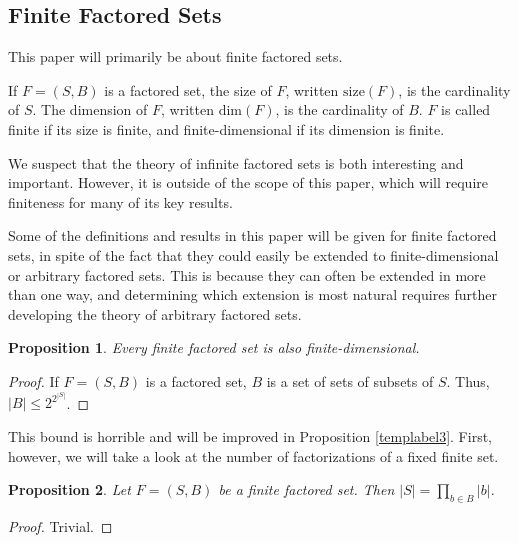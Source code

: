 \documentclass[authordate,onecolumn]{miri-tech-article}
\newtheorem{proposition}{Proposition}
\begin{document}
\subsection{Finite Factored Sets}
This paper will primarily be about finite factored sets.
\begin{definition}
If $F=(S,B)$ is a factored set, the size of $F$, written $\text{size}(F)$, is the cardinality of $S$. The dimension of $F$, written $\text{dim}(F)$, is the cardinality of $B$. $F$ is called finite if its size is finite, and finite-dimensional if its dimension is finite.
\end{definition}
We suspect that the theory of infinite factored sets is both interesting and important. However, it is outside of the scope of this paper, which will require finiteness for many of its key results.

Some of the definitions and results in this paper will be given for finite factored sets, in spite of the fact that they could easily be extended to finite-dimensional or arbitrary factored sets. This is because they can often be extended in more than one way, and determining which extension is most natural requires further developing the theory of arbitrary factored sets.

\begin{proposition}
Every finite factored set is also finite-dimensional.
\end{proposition}
\begin{proof}
If $F=(S,B)$ is a factored set, $B$ is a set of sets of subsets of $S$. Thus, $|B|\leq 2^{2^{|S|}}$.
\end{proof}
This bound is horrible and will be improved in Proposition \ref{templabel3}. First, however, we will take a look at the number of factorizations of a fixed finite set. 

\begin{proposition}\label{sizeffs}
Let $F=(S,B)$ be a finite factored set. Then $|S|=\prod_{b\in B} |b|$.
\end{proposition}

\begin{proof}
Trivial.
\end{proof}
\end{document}
